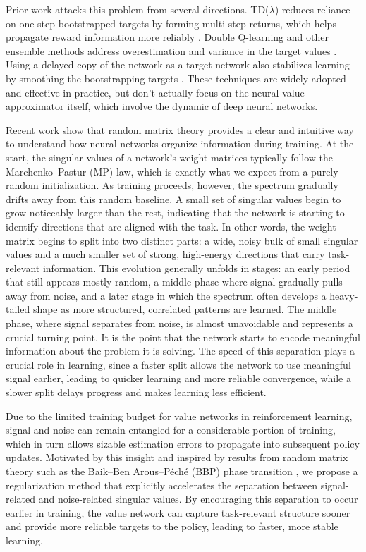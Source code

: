 Prior work attacks this problem from several directions. TD($\lambda$) reduces reliance on one-step bootstrapped targets by forming multi-step returns, which helps propagate reward information more reliably \cite{sutton1998reinforcement}. Double Q-learning and other ensemble methods address overestimation and variance in the target values \cite{van2016deep,hasselt2010double,lee2021sunrise}. Using a delayed copy of the network as a target network also stabilizes learning by smoothing the bootstrapping targets \cite{mnih2013playing}. These techniques are widely adopted and effective in practice, but don't actually focus on the neural value approximator itself, which involve the dynamic of  deep neural networks.


Recent work show that random matrix theory provides a clear and intuitive way to understand how neural networks organize information during training. At the start, the singular values of a network’s weight matrices typically follow the Marchenko–Pastur (MP) law, which is exactly what we expect from a purely random initialization. As training proceeds, however, the spectrum gradually drifts away from this random baseline. A small set of singular values begin to grow noticeably larger than the rest, indicating that the network is starting to identify directions that are aligned with the task. In other words, the weight matrix begins to split into two distinct parts: a wide, noisy bulk of small singular values and a much smaller set of strong, high-energy directions that carry task-relevant information. This evolution generally unfolds in stages: an early period that still appears mostly random, a middle phase where signal gradually pulls away from noise, and a later stage in which the spectrum often develops a heavy-tailed shape as more structured, correlated patterns are learned. The middle phase, where signal separates from noise, is almost unavoidable and represents a crucial turning point. It is the point that the network starts to encode meaningful information about the problem it is solving. The speed of this separation plays a crucial role in learning, since a faster split allows the network to use meaningful signal earlier, leading to quicker learning and more reliable convergence, while a slower split delays progress and makes learning less efficient. 

Due to the limited training budget for value networks in reinforcement learning, signal and noise can remain entangled for a considerable portion of training, which in turn allows sizable estimation errors to propagate into subsequent policy updates. Motivated by this insight and inspired by results from random matrix theory such as the Baik–Ben Arous–Péché (BBP) phase transition \cite{baik2005phase}, we propose a regularization method that explicitly accelerates the separation between signal-related and noise-related singular values. By encouraging this separation to occur earlier in training, the value network can capture task-relevant structure sooner and provide more reliable targets to the policy, leading to faster, more stable learning.


